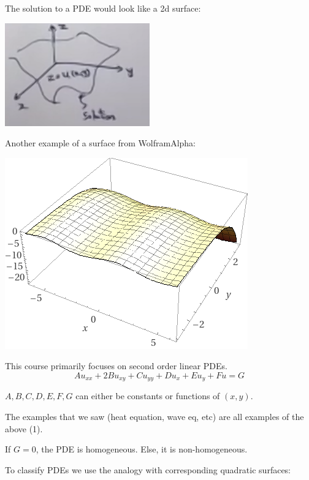 \documentclass{article}
\begin{document}
\hfill

The solution to a PDE would look like a 2d surface: 

\includegraphics[width = 0.7 \textwidth]{image1.png}

Another example of a surface from WolframAlpha:

\includegraphics[width = 0.7 \textwidth]{image6.png}

\hfill

This course primarily focuses on second order linear PDEs. 
\begin{equation}
    A u_{xx} + 2 B u_{xy} + C u_{yy} + D u_x + E u_y + Fu = G
\end{equation}

$A,B,C,D,E,F,G$ can either be constants or functions of $(x,y)$.

The examples that we saw (heat equation, wave eq, etc) are all examples of the above (1). 

\hfill


If $G = 0$, the PDE is homogeneous. Else, it is non-homogeneous. 

To classify PDEs we use the analogy with corresponding quadratic surfaces:
\end{document}

